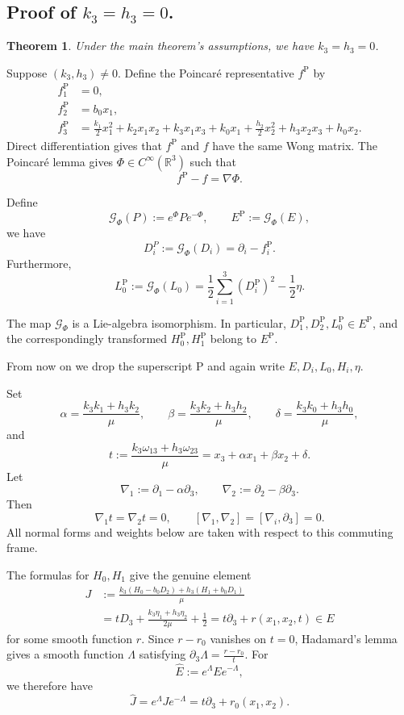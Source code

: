\documentclass[11pt,a4paper]{article}
\numberwithin{equation}{section}
\theoremstyle{journalplain}
\newtheorem{theorem}{Theorem}[section]
\theoremstyle{journaldef}
\begin{document}
\subsection{Proof of $k_3 = h_3 = 0$.}


\begin{theorem}\label{thm:sector-I-smooth}
Under the main theorem's assumptions, we have $k_3=h_3=0$.
\end{theorem}

\begin{tcolorbox}[
  title={Proof of Theorem~\ref{thm:sector-I-smooth}},
  breakable
]
Suppose $(k_3,h_3)\neq 0$.
Define the Poincar\'e representative \(f^{\mathrm P}\) by
\begin{align}
f_1^{\mathrm P}&=0,\\
f_2^{\mathrm P}&=b_0x_1,\\
f_3^{\mathrm P}
&=\frac{k_1}{2}x_1^2+k_2x_1x_2+k_3x_1x_3+k_0x_1
 +\frac{h_2}{2}x_2^2+h_3x_2x_3+h_0x_2.
\end{align}
Direct differentiation gives that \(f^{\mathrm P}\) and \(f\) have the same Wong
matrix. The Poincar\'e lemma gives
\(\Phi\in C^\infty(\mathbb R^3)\) such that
\[
f^{\mathrm P}-f=\nabla\Phi.
\]

Define
\[
\mathcal G_\Phi(P):=e^\Phi Pe^{-\Phi},
\qquad
E^{\mathrm P}:=\mathcal G_\Phi(E),
\]
we have
\[
D_i^P
:=\mathcal G_\Phi(D_i)
=\partial_i-f_i^{\mathrm P}.
\]
Furthermore,
\[
L_0^{\mathrm P}
:=\mathcal G_\Phi(L_0)
=\frac12\sum_{i=1}^3(D_i^{\mathrm P})^2
 -\frac12\eta.
\]

The map \(\mathcal G_\Phi\) is a Lie-algebra isomorphism. In particular,
\(D_1^{\mathrm P},D_2^{\mathrm P},L_0^{\mathrm P}\in E^{\mathrm P}\),
and the correspondingly transformed \(H_0^{\mathrm P},H_1^{\mathrm P}\)
belong to \(E^{\mathrm P}\). 

From now on we drop the superscript \({\mathrm P}\) and again write
\(E,D_i,L_0,H_i,\eta\).


Set
\[
\alpha=\frac{k_3k_1+h_3k_2}{\mu},
\qquad
\beta=\frac{k_3k_2+h_3h_2}{\mu},
\qquad
\delta=\frac{k_3k_0+h_3h_0}{\mu},
\]
and
\[
t:=\frac{k_3\omega_{13}+h_3\omega_{23}}{\mu}
=x_3+\alpha x_1+\beta x_2+\delta.
\]
Let
\[
\nabla_1:=\partial_1-\alpha \partial_3,
\qquad
\nabla_2:=\partial_2-\beta \partial_3.
\]
Then
\[
\nabla_1t=\nabla_2t=0,
\qquad
[\nabla_1,\nabla_2]=[\nabla_i,\partial_3]=0.
\]
All normal forms and weights below are taken with respect to this commuting
frame.

The formulas for \(H_0,H_1\) give the genuine element
\[
\begin{aligned}
J
&:=
\frac{k_3(H_0-b_0D_2)+h_3(H_1+b_0D_1)}{\mu}\\
&=
tD_3+\frac{k_3\eta_1+h_3\eta_2}{2\mu}+\frac12
=t\partial_3+r(x_1,x_2,t)
\in E
\end{aligned}
\]
for some smooth function \(r\).
Since \(r-r_0\) vanishes on \(t=0\), Hadamard's lemma gives a smooth
function \(\Lambda\) satisfying
\(
\partial_3\Lambda=\frac{r-r_0}{t}.
\)
For
\[
\widehat E:=e^\Lambda Ee^{-\Lambda},
\]
we therefore have
\[
\widehat J
=e^\Lambda Je^{-\Lambda}
=t\partial_3+r_0(x_1,x_2).
\]


\end{tcolorbox}
\end{document}
